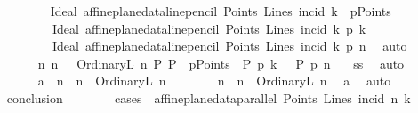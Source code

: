\begin{isabellebody}
\ \ \ \ \ \ \ \ \isamarkupfalse%
\ {\isacartoucheopen}Ideal\ {\isacharparenleft}{\kern0pt}affine{\isacharunderscore}{\kern0pt}plane{\isacharunderscore}{\kern0pt}data{\isachardot}{\kern0pt}line{\isacharunderscore}{\kern0pt}pencil\ Points\ Lines\ incid\ k{}{\isacharparenright}{\kern0pt}\ {\isasymin}\ pPoints{\isacartoucheclose}\ \isanewline
\ \ \ \ \ \ \ \ \ \ {\isacartoucheopen}{\isacharparenleft}{\kern0pt}Ideal\ {\isacharparenleft}{\kern0pt}affine{\isacharunderscore}{\kern0pt}plane{\isacharunderscore}{\kern0pt}data{\isachardot}{\kern0pt}line{\isacharunderscore}{\kern0pt}pencil\ Points\ Lines\ incid\ k{}{\isacharparenright}{\kern0pt}{\isacharparenright}{\kern0pt}\ p{\isasymlhd}\ k{\isacartoucheclose}\isanewline
\ \ \ \ \ \ \ \ \ \ {\isacartoucheopen}{\isacharparenleft}{\kern0pt}Ideal\ {\isacharparenleft}{\kern0pt}affine{\isacharunderscore}{\kern0pt}plane{\isacharunderscore}{\kern0pt}data{\isachardot}{\kern0pt}line{\isacharunderscore}{\kern0pt}pencil\ Points\ Lines\ incid\ k{}{\isacharparenright}{\kern0pt}{\isacharparenright}{\kern0pt}\ p{\isasymlhd}\ n{\isacartoucheclose}\ \isamarkupfalse%
\ auto\isanewline
\ \ \ \ \ \ \isamarkupfalse%
\ {\isachardoublequoteopen}{\isasymexists}n{}{\isachardot}{\kern0pt}\ n\ {\isacharequal}{\kern0pt}\ \ OrdinaryL\ n{}\ {\isasymLongrightarrow}{\isasymexists}P{\isachardot}{\kern0pt}\ P\ {\isasymin}\ pPoints\ {\isasymand}\ P\ p{\isasymlhd}\ k\ \ {\isasymand}\ P\ p{\isasymlhd}\ n{\isachardoublequoteclose}\ \ \isamarkupfalse%
\ ss\ \isamarkupfalse%
\ auto\isanewline
\ \ \ \ \isamarkupfalse%
\isanewline
\ \ \ \ \ \ \isamarkupfalse%
\ a{}{\isacharcolon}{\kern0pt}\ {\isachardoublequoteopen}{\isacharparenleft}{\kern0pt}{\isasymexists}\ n{}\ {\isachardot}{\kern0pt}\ n\ {\isacharequal}{\kern0pt}\ OrdinaryL\ n{}{\isacharparenright}{\kern0pt}{\isachardoublequoteclose}\isanewline
\ \ \ \ \ \ \isamarkupfalse%
\ n{}\ \ {\isachardoublequoteopen}n\ {\isacharequal}{\kern0pt}\ OrdinaryL\ n{}{\isachardoublequoteclose}\ \isamarkupfalse%
\ a{}\ \isamarkupfalse%
\ auto\isanewline
\ \ \ \ \ \ \isamarkupfalse%
\ \isamarkupfalse%
\ {\isacharquery}{\kern0pt}conclusion\isanewline
\ \ \ \ \ \ \isamarkupfalse%
\ {\isacharparenleft}{\kern0pt}cases\ \ {\isachardoublequoteopen}affine{\isacharunderscore}{\kern0pt}plane{\isacharunderscore}{\kern0pt}data{\isachardot}{\kern0pt}parallel\ Points\ Lines\ {\isacharparenleft}{\kern0pt}incid{\isacharparenright}{\kern0pt}\ n{}\ k{}{\isachardoublequoteclose}{\isacharparenright}{\kern0pt}\ \isanewline

\end{isabellebody}
